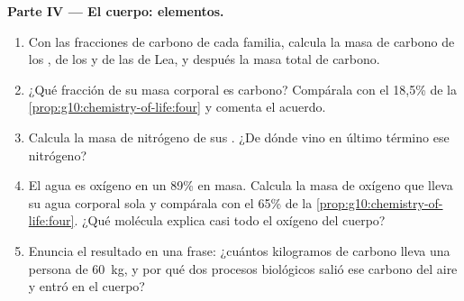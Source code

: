 \begin{problem}
\medskip
\noindent\textbf{Parte IV --- El cuerpo: elementos.}
\begin{enumerate}[resume]
  \item Con las fracciones de carbono de cada familia, calcula la masa
        de carbono de los , de los  y de las 
        de Lea, y después la masa total de carbono.
  \item ¿Qué fracción de su masa corporal es carbono? Compárala con el
        18,5\% de la \cref{prop:g10:chemistry-of-life:four} y comenta
        el acuerdo.
  \item Calcula la masa de nitrógeno de sus . ¿De dónde vino
        en último término ese nitrógeno?
  \item El agua es oxígeno en un 89\% en masa. Calcula la masa de
        oxígeno que lleva su agua corporal sola y compárala con el 65\%
        de la \cref{prop:g10:chemistry-of-life:four}. ¿Qué molécula
        explica casi todo el oxígeno del cuerpo?
  \item Enuncia el resultado en una frase: ¿cuántos kilogramos de
        carbono lleva una persona de \qty{60}{kg}, y por qué dos
        procesos biológicos salió ese carbono del aire y entró en el
        cuerpo?
\end{enumerate}
\end{problem}

